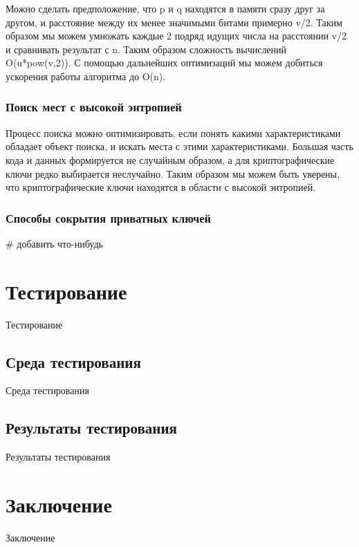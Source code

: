 \documentclass[20pt]{article}
\begin{document}
Можно сделать предположение, что p и q находятся в памяти сразу друг за другом,
и расстояние между их менее значимыми битами примерно v/2. Таким образом мы можем
умножать каждые 2 подряд идущих числа на расстоянии v/2 и сравнивать результат с
n. Таким образом сложность вычислений O(u*pow(v,2)). С помощью дальнейших оптимизаций
мы можем добиться ускорения работы алгоритма до O(n).

\subsubsection{Поиск мест с высокой энтропией}

Процесс поиска можно оптимизировать, если понять какими характеристиками обладает
объект поиска, и искать места с этими характеристиками. Большая часть кода и данных
формируется не случайным образом, а для криптографические ключи редко выбирается
неслучайно. Таким образом мы можем быть уверены, что криптографические ключи находятся
в области с высокой энтропией.

\subsubsection{Способы сокрытия приватных ключей}
\# добавить что-нибудь

\newpage

\section{Тестирование}
Тестирование

\subsection{Среда тестирования}
Среда тестирования

\subsection{Результаты тестирования}
Результаты тестирования

\newpage

\section{Заключение}
Заключение



\end{document}

